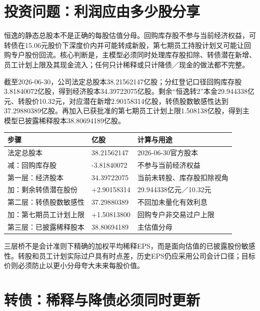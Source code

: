 \section{投资问题：利润应由多少股分享}

恒逸的静态总股本不是正确的每股估值分母。回购库存股不参与当前经济权益，可转债在15.06元股价下深度价内并可能转成新股，第七期员工持股计划又可能让回购专户股份回流。核心判断是，主模型必须同时处理库存股扣除、转债潜在新增、员工计划上限及其现金流入；任何只计稀释或只计降债／现金的做法都不完整。

截至2026-06-30，公司法定总股本38.21562147亿股；分红登记口径回购库存股3.81840072亿股，得到经济股本34.39722075亿股。剩余“恒逸转2”本金29.944338亿元、转股价10.32元，对应潜在新增2.90158314亿股，转债股数敏感性达到37.29880389亿股。再加入已获批准的第七期员工计划上限1.508138亿股，得到主模型已披露稀释股本38.80694189亿股。

\begin{exhibitbox}[三层股本桥]
\noindent\begin{tabularx}{\textwidth}{L{4.3cm}R{2.3cm}X}
\toprule
\textbf{步骤} & \textbf{亿股} & \textbf{计算与用途} \\
\midrule
法定总股本 & 38.21562147 & 2026-06-30官方股本 \\
减：回购库存股 & -3.81840072 & 不参与当前经济权益 \\
第一层：经济股本 & 34.39722075 & 当前未转股、库存股扣除视角 \\
加：剩余转债潜在股份 & +2.90158314 & 29.944338亿元／10.32元 \\
第二层：转债股数敏感性 & 37.29880389 & 不回加未量化有效利息 \\
加：第七期员工计划上限 & +1.50813800 & 回购专户非交易过户上限 \\
第三层：已披露稀释股本 & 38.80694189 & 主估值分母 \\
\bottomrule
\end{tabularx}
\end{exhibitbox}

三层桥不是会计准则下精确的加权平均稀释EPS，而是面向估值的已披露股份敏感性。转股和员工计划实际过户具有时点差，历史EPS仍应采用公司会计口径；目标价则必须防止以更小分母夸大未来每股价值。

\section{转债：稀释与降债必须同时更新}

